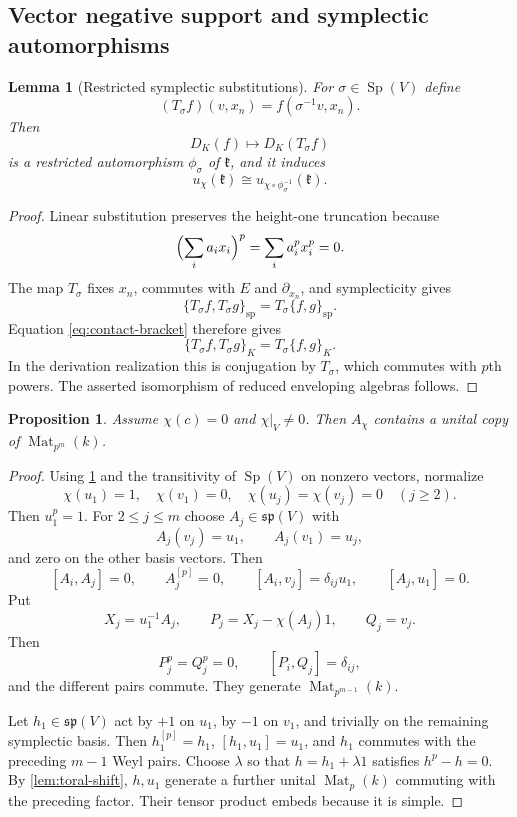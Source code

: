 \documentclass[11pt,reqno]{amsart}
\newtheorem{proposition}[proposition]{Proposition}
\newtheorem{lemma}[lemma]{Lemma}
\theoremstyle{definition}
\theoremstyle{remark}
\theoremstyle{definition}
\newcommand{\kk}{\mathfrak{k}}
\newcommand{\Achi}{A_{\chi}}
\newcommand{\Mat}{\operatorname{Mat}}
\begin{document}
\subsection{Vector negative support and symplectic automorphisms}

\begin{lemma}[Restricted symplectic substitutions]\label{lem:sp-auto}
For $\sigma\in\operatorname{Sp}(V)$ define
\[
 (T_\sigma f)(v,x_n)=f(\sigma^{-1}v,x_n).
\]
Then
\[
 D_K(f)\longmapsto D_K(T_\sigma f)
\]
is a restricted automorphism $\phi_\sigma$ of $\kk$, and it induces
\[
 u_\chi(\kk)\cong u_{\chi\circ\phi_\sigma^{-1}}(\kk).
\]
\end{lemma}

\begin{proof}
Linear substitution preserves the height-one truncation because
\[
 \Bigl(\sum_i a_ix_i\Bigr)^p=\sum_i a_i^px_i^p=0.
\]
The map $T_\sigma$ fixes $x_n$, commutes with $E$ and $\partial_{x_n}$,
and symplecticity gives
\[
 \{T_\sigma f,T_\sigma g\}_{\mathrm{sp}}
 =T_\sigma\{f,g\}_{\mathrm{sp}}.
\]
Equation \eqref{eq:contact-bracket} therefore gives
\[
 \{T_\sigma f,T_\sigma g\}_K
 =T_\sigma\{f,g\}_K.
\]
In the derivation realization this is conjugation by $T_\sigma$, which
commutes with $p$th powers.  The asserted isomorphism of reduced enveloping
algebras follows.
\end{proof}

\begin{proposition}\label{prop:vector-negative}
Assume $\chi(c)=0$ and $\chi|_V\ne0$.  Then $\Achi$ contains a unital
copy of $\Mat_{p^m}(k)$.
\end{proposition}

\begin{proof}
Using \cref{lem:sp-auto} and the transitivity of $\operatorname{Sp}(V)$ on
nonzero vectors, normalize
\[
 \chi(u_1)=1,\quad \chi(v_1)=0,\quad
 \chi(u_j)=\chi(v_j)=0\quad(j\ge2).
\]
Then $u_1^p=1$.  For $2\le j\le m$ choose
$A_j\in\mathfrak{sp}(V)$ with
\[
 A_j(v_j)=u_1,\qquad A_j(v_1)=u_j,
\]
and zero on the other basis vectors.  Then
\[
 [A_i,A_j]=0,\qquad A_j^{[p]}=0,
 \qquad [A_i,v_j]=\delta_{ij}u_1,
 \qquad [A_j,u_1]=0.
\]
Put
\[
 X_j=u_1^{-1}A_j,
 \qquad P_j=X_j-\chi(A_j)1,
 \qquad Q_j=v_j.
\]
Then
\[
 P_j^p=Q_j^p=0,
 \qquad [P_i,Q_j]=\delta_{ij},
\]
and the different pairs commute.  They generate
$\Mat_{p^{m-1}}(k)$.

Let $h_1\in\mathfrak{sp}(V)$ act by $+1$ on $u_1$, by $-1$ on $v_1$,
and trivially on the remaining symplectic basis.  Then $h_1^{[p]}=h_1$,
$[h_1,u_1]=u_1$, and $h_1$ commutes with the preceding $m-1$ Weyl pairs.
Choose $\lambda$ so that $h=h_1+\lambda1$ satisfies $h^p-h=0$.  By
\cref{lem:toral-shift}, $h,u_1$ generate a further unital $\Mat_p(k)$
commuting with the preceding factor.  Their tensor product embeds because it
is simple.
\end{proof}
\end{document}
